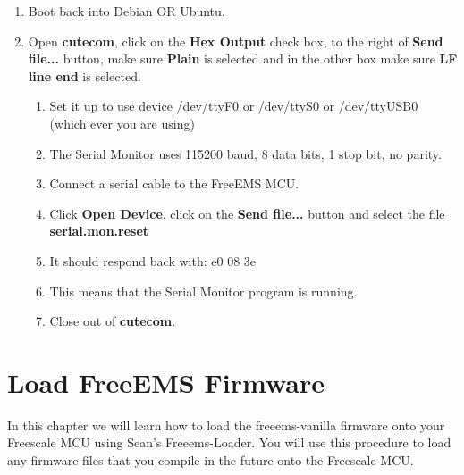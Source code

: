 \documentclass[12pt,notitlepage,onecolumn,oneside,openany]{memoir}
\begin{document}
\begin{enumerate}
\item \textsf{Boot back into Debian OR Ubuntu.}

\item \textsf{Open \textbf{cutecom}, click on the \textbf{Hex Output} check box, to the right of \textbf{Send file...} button, make sure \textbf{Plain} is selected and in the other box make sure \textbf{LF line end} is selected.}

      \begin{enumerate}
      \item \textsf{Set it up to use device /dev/ttyF0 or /dev/ttyS0 or /dev/ttyUSB0 (which ever you are using)}
      \item \textsf{The Serial Monitor uses 115200 baud, 8 data bits, 1 stop bit, no parity.}
      \item \textsf{Connect a serial cable to the FreeEMS MCU.}
      \item \textsf{Click \textbf{Open Device}, click on the \textbf{Send file...} button and select the file \textbf{serial.mon.reset}}
      \item \textsf{It should respond back with: e0 08 3e}
      \item \textsf{This means that the Serial Monitor program is running.}  
      \item \textsf{Close out of \textbf{cutecom}.}
      \end{enumerate}
\end{enumerate}

\chapter{\textsf{Load FreeEMS Firmware}}

\textsf{In this chapter we will learn how to load the freeems-vanilla firmware onto your Freescale MCU using Sean's Freeems-Loader.  You will use this procedure to load any firmware files that you compile in the future onto the Freescale MCU.} \newline
\end{document}
